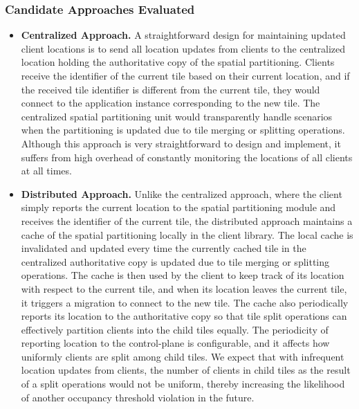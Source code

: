 \subsubsection{Candidate Approaches Evaluated}
\begin{itemize}
\item \textbf{Centralized Approach. }A straightforward design for maintaining updated client locations is to send all location updates from clients to the centralized location holding the authoritative copy of the spatial partitioning. Clients receive the identifier of the current tile based on their current location, and if the received tile identifier is different from the current tile, they would connect to the application instance corresponding to the new tile. The centralized spatial partitioning unit would transparently handle scenarios when the partitioning is updated due to tile merging or splitting operations. Although this approach is very straightforward to design and implement, it suffers from high overhead of constantly monitoring the locations of all clients at all times.
\item \textbf{Distributed Approach. } Unlike the centralized approach, where the client simply reports the current location to the spatial partitioning module and receives the identifier of the current tile, the distributed approach maintains a cache of the spatial partitioning locally in the client library. The local cache is invalidated and updated every time the currently cached tile in the centralized authoritative copy is updated due to tile merging or splitting operations. The cache is then used by the client to keep track of its location with respect to the current tile, and when its location leaves the current tile, it triggers a migration to connect to the new tile. The cache also periodically reports its location to the authoritative copy so that tile split operations can effectively partition clients into the child tiles equally. The periodicity of reporting location to the control-plane is configurable, and it affects how uniformly clients are split among child tiles. We expect that with infrequent location updates from clients, the number of clients in child tiles as the result of a split operations would not be uniform, thereby increasing the likelihood of another occupancy threshold violation in the future.
\end{itemize}

